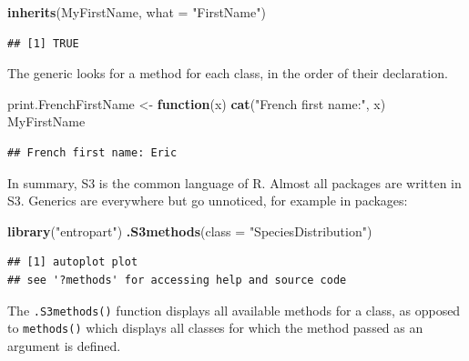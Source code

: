 \documentclass[
  12pt,
  american,
  a4paper,
  extrafontsizes,onecolumn,openright
  ]{memoir}
\newenvironment{Shaded}{\begin{snugshade}}{\end{snugshade}}
\newcommand{\AttributeTok}[1]{\textcolor[rgb]{0.13,0.29,0.53}{#1}}
\newcommand{\ControlFlowTok}[1]{\textcolor[rgb]{0.13,0.29,0.53}{\textbf{#1}}}
\newcommand{\FunctionTok}[1]{\textcolor[rgb]{0.13,0.29,0.53}{\textbf{#1}}}
\newcommand{\NormalTok}[1]{#1}
\newcommand{\OtherTok}[1]{\textcolor[rgb]{0.56,0.35,0.01}{#1}}
\newcommand{\StringTok}[1]{\textcolor[rgb]{0.31,0.60,0.02}{#1}}
\begin{document}
\begin{Shaded}
\begin{Highlighting}[]
\FunctionTok{inherits}\NormalTok{(MyFirstName, }\AttributeTok{what =} \StringTok{"FirstName"}\NormalTok{)}
\end{Highlighting}
\end{Shaded}

\begin{verbatim}
## [1] TRUE
\end{verbatim}

\normalsize

The generic looks for a method for each class, in the order of their declaration.

\scriptsize

\begin{Shaded}
\begin{Highlighting}[]
\NormalTok{print.FrenchFirstName }\OtherTok{\textless{}{-}} \ControlFlowTok{function}\NormalTok{(x) }\FunctionTok{cat}\NormalTok{(}\StringTok{"French first name:"}\NormalTok{, x) }
\NormalTok{MyFirstName}
\end{Highlighting}
\end{Shaded}

\begin{verbatim}
## French first name: Eric
\end{verbatim}

\normalsize

In summary, S3 is the common language of R.
Almost all packages are written in S3.
Generics are everywhere but go unnoticed, for example in packages:

\scriptsize

\begin{Shaded}
\begin{Highlighting}[]
\FunctionTok{library}\NormalTok{(}\StringTok{"entropart"}\NormalTok{)}
\FunctionTok{.S3methods}\NormalTok{(}\AttributeTok{class =} \StringTok{"SpeciesDistribution"}\NormalTok{)}
\end{Highlighting}
\end{Shaded}

\begin{verbatim}
## [1] autoplot plot    
## see '?methods' for accessing help and source code
\end{verbatim}

\normalsize

The \texttt{.S3methods()} function displays all available methods for a class, as opposed to \texttt{methods()} which displays all classes for which the method passed as an argument is defined.
\end{document}
